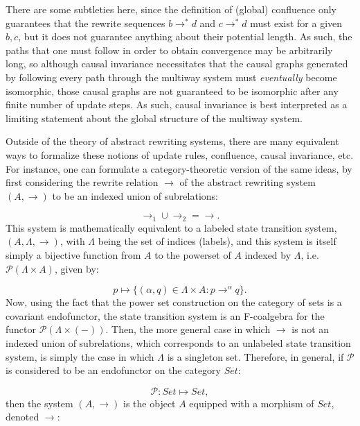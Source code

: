 \documentclass{article}
\begin{document}
There are some subtleties here, since the definition of (global) confluence only guarantees that the rewrite sequences ${b \to^{*} d}$ and ${c \to^{*} d}$ must exist for a given ${b, c}$, but it does not guarantee anything about their potential length. As such, the paths that one must follow in order to obtain convergence may be arbitrarily long, so although causal invariance necessitates that the causal graphs generated by following every path through the multiway system must \textit{eventually} become isomorphic, those causal graphs are not guaranteed to be isomorphic after any finite number of update steps. As such, causal invariance is best interpreted as a limiting statement about the global structure of the multiway system.

Outside of the theory of abstract rewriting systems, there are many equivalent ways to formalize these notions of update rules, confluence, causal invariance, etc. For instance, one can formulate a category-theoretic version of the same ideas, by first considering the rewrite relation ${\to}$ of the abstract rewriting system ${\left( A, \to \right)}$ to be an indexed union of subrelations:

\begin{equation}
\to_{1} \cup \to_{2} = \to.
\end{equation}
This system is mathematically equivalent to a labeled state transition system, ${\left( A, \Lambda, \to \right)}$, with ${\Lambda}$ being the set of indices (labels), and this system is itself simply a bijective function from $A$ to the powerset of $A$ indexed by ${\Lambda}$, i.e. ${\mathcal{P} \left( \Lambda \times A \right)}$, given by:

\begin{equation}
p \mapsto \lbrace \left( \alpha, q \right) \in \Lambda \times A : p \to^{\alpha} q \rbrace.
\end{equation}
Now, using the fact that the power set construction on the category of sets is a covariant endofunctor, the state transition system is an F-coalgebra for the functor ${\mathcal{P} \left( \Lambda \times \left( - \right) \right)}$. Then, the more general case in which ${\to}$ is not an indexed union of subrelations, which corresponds to an unlabeled state transition system, is simply the case in which ${\Lambda}$ is a singleton set. Therefore, in general, if ${\mathcal{P}}$ is considered to be an endofunctor on the category ${Set}$:

\begin{equation}
\mathcal{P} : Set \mapsto Set,
\end{equation}
then the system ${\left( A, \to \right)}$ is the object $A$ equipped with a morphism of ${Set}$, denoted ${\to}$:
\end{document}
